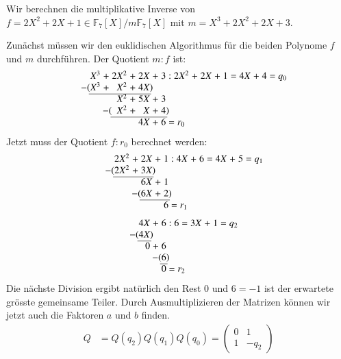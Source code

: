 \begin{beispiel}
Wir berechnen die multiplikative Inverse von
$f=2X^2+2X+1\in\mathbb{F}_7[X]/m\mathbb{F}_7[X]$ 
mit $m = X^3 + 2X^2 + 2X + 3$.

Zunächst müssen wir den euklidischen Algorithmus für die beiden Polynome
$f$ und $m$ durchführen.
Der Quotient $m:f$ ist:
\[
\arraycolsep=1.4pt
\begin{array}{rcrcrcrcrcrcrcrcr}
  X^3&+&2X^2&+&2X&+&3&:&2X^2&+&2X&+&1&=&4X&+&4\rlap{$\mathstrut=q_0$}\\
\llap{$-($}X^3&+& X^2&+&4X\rlap{$)$}& & & &    & &  & & & &  & & \\ \cline{1-5}
     & & X^2&+&5X&+&3& &    & &  & & & &  & & \\
     &&\llap{$-(\phantom{2}$}X^2&+& X&+&4\rlap{$)$}& &    & &  & & & &  & & \\ \cline{3-7}
     & &    & &4X&+&6\rlap{$\mathstrut=r_0$}& &    & &  & & & &  & &
\end{array}
\]
Jetzt muss der Quotient $f:r_0$ berechnet werden:
\[
\arraycolsep=1.4pt
\begin{array}{rcrcrcrcrcrcrcrcr}
  2X^2&+&2X&+&1&:&4X&+&6&=&4X&+&5\rlap{$\mathstrut=q_1$}\\
\llap{$-($}2X^2&+&3X\rlap{$)$}& & & &  & & & &  \\ \cline{1-3}
      & &6X&+&1& &  & & & &  \\
      & &\llap{$-($}6X&+&2\rlap{$)$}& &  & & & &  \\ \cline{3-5}
      & &  & &6\rlap{$\mathstrut=r_1$}& & & &  & & & &
\end{array}
\]
\[
\arraycolsep=1.4pt
\begin{array}{rcrcrcrcr}
4X&+&6&:&6&=&3X&+&1\rlap{$\mathstrut=q_2$} \\
\llap{$-($}4X\rlap{$)$}& & & & & &  & &  \\ \cline{1-1}
 0&+&6& & & &  & & \\
  & &\llap{$-($}6\rlap{$)$}& & & &  & &\\ \cline{3-3}
  & &0\rlap{$\mathstrut=r_2$}& & & &  & &
\end{array}
\]
Die nächste Division ergibt natürlich den Rest $0$ und $6=-1$ ist der
erwartete grösste gemeinsame Teiler.
Durch Ausmultiplizieren der Matrizen können wir jetzt auch die 
Faktoren $a$ und $b$ finden.
\begin{align*}
Q&= Q(q_2)Q(q_1)Q(q_0)
=
\begin{pmatrix}0&1\\1&-q_2\end{pmatrix}

\end{align*}
\end{beispiel}
